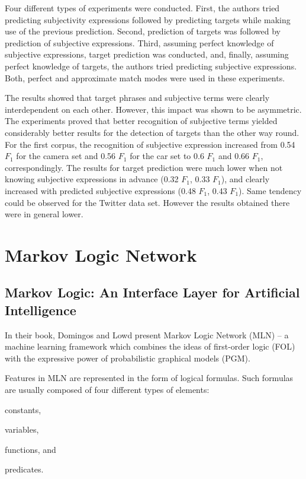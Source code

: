 \documentclass[a4paper,11pt]{article}
\begin{document}
Four different types of experiments were conducted.  First, the authors tried
predicting subjectivity expressions followed by predicting targets while
making use of the previous prediction.  Second, prediction of targets was
followed by prediction of subjective expressions.  Third, assuming perfect
knowledge of subjective expressions, target prediction was conducted, and,
finally, assuming perfect knowledge of targets, the authors tried predicting
subjective expressions.  Both, perfect and approximate match modes were used
in these experiments.

The results showed that target phrases and subjective terms were clearly
interdependent on each other.  However, this impact was shown to be
asymmetric.  The experiments proved that better recognition of subjective
terms yielded considerably better results for the detection of targets than
the other way round.  For the first corpus, the recognition of subjective
expression increased from 0.54 $F_1$ for the camera set and 0.56 $F_1$ for the
car set to 0.6 $F_1$ and 0.66 $F_1$, correspondingly. The results for target
prediction were much lower when not knowing subjective expressions in advance
(0.32 $F_1$, 0.33 $F_1$), and clearly increased with predicted subjective
expressions (0.48 $F_1$, 0.43 $F_1$).  Same tendency could be observed for the
Twitter data set.  However the results obtained there were in general lower.

\section{Markov Logic Network}

\subsection{Markov Logic: An Interface Layer for Artificial Intelligence \cite{Domingos-09}}

In their book, Domingos and Lowd present Markov Logic Network (MLN) -- a
machine learning framework which combines the ideas of first-order logic (FOL)
with the expressive power of probabilistic graphical models (PGM).

Features in MLN are represented in the form of logical formulas.  Such
formulas are usually composed of four different types of elements:
\begin{inparaenum}
\item constants,
\item variables,
\item functions, and
\item predicates.
\end{inparaenum}
\end{document}
